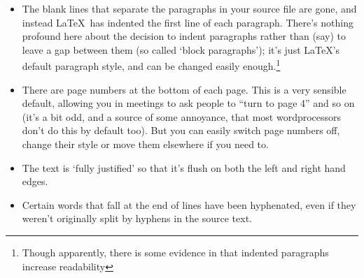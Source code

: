 \begin{refsection}

\begin{itemize}
\item The blank lines that separate the paragraphs in your source file are gone, and instead \LaTeX\ has indented the first line of each paragraph. There's nothing profound here about the decision to indent paragraphs rather than (say) to leave a gap between them (so called `block paragraphs'); it's just \LaTeX's default paragraph style, and can be changed easily enough.\footnote{Though apparently, there is some evidence in \cite{tinker63} that indented paragraphs increase readability}
\item There are page numbers at the bottom of each page. This is a very sensible default, allowing you in meetings to ask people to ``turn to page 4'' and so on (it's a bit odd, and a source of some annoyance, that most wordprocessors don't do this by default too). But you can easily switch page numbers off, change their style or move them elsewhere if you need to. 
\item The text is `fully justified' so that it's flush on both the left and right hand edges.
\item Certain words that fall at the end of lines have been hyphenated, even if they weren't originally split by hyphens in the source text.
\end{itemize}


\end{refsection}

